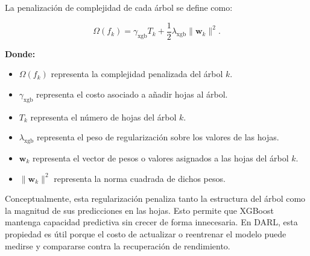 La penalización de complejidad de cada árbol se define como:

\begin{equation}
    \Omega(f_k) = \gamma_{\text{xgb}} T_k
    + \frac{1}{2}\lambda_{\text{xgb}}\lVert\mathbf{w}_k\rVert^2.
    \label{eq:xgboost_regularization}
\end{equation}

\noindent\textbf{Donde:}
\begin{itemize}
    \item $\Omega(f_k)$ representa la complejidad penalizada del árbol $k$.
    \item $\gamma_{\text{xgb}}$ representa el costo asociado a añadir hojas al árbol.
    \item $T_k$ representa el número de hojas del árbol $k$.
    \item $\lambda_{\text{xgb}}$ representa el peso de regularización sobre los valores de las hojas.
    \item $\mathbf{w}_k$ representa el vector de pesos o valores asignados a las hojas del árbol $k$.
    \item $\lVert\mathbf{w}_k\rVert^2$ representa la norma cuadrada de dichos pesos.
\end{itemize}

Conceptualmente, esta regularización penaliza tanto la estructura del árbol como la magnitud
de sus predicciones en las hojas. Esto permite que XGBoost mantenga capacidad predictiva sin
crecer de forma innecesaria. En DARL, esta propiedad es útil porque el costo de actualizar o
reentrenar el modelo puede medirse y compararse contra la recuperación de rendimiento.
